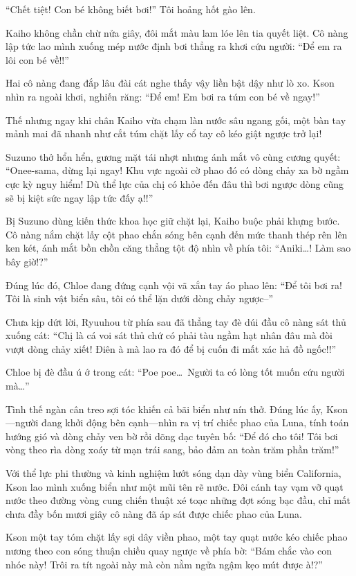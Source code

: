\documentclass[../main.tex]{subfiles}
\begin{document}
``Chết tiệt! Con bé không biết bơi!'' Tôi hoảng hốt gào lên.

Kaiho không chần chừ nửa giây, đôi mắt màu lam lóe lên tia quyết liệt. Cô nàng lập tức lao mình xuống mép nước định bơi thẳng ra khơi cứu người: ``Để em ra lôi con bé về!!''

Hai cô nàng đang đắp lâu đài cát nghe thấy vậy liền bật dậy như lò xo. Kson nhìn ra ngoài khơi, nghiến răng: ``Để em! Em bơi ra túm con bé về ngay!''

Thế nhưng ngay khi chân Kaiho vừa chạm làn nước sâu ngang gối, một bàn tay mảnh mai đã nhanh như cắt túm chặt lấy cổ tay cô kéo giật ngược trở lại!

Suzuno thở hổn hển, gương mặt tái nhợt nhưng ánh mắt vô cùng cương quyết: ``Onee-sama, dừng lại ngay! Khu vực ngoài cờ phao đó có dòng chảy xa bờ ngầm cực kỳ nguy hiểm! Dù thể lực của chị có khỏe đến đâu thì bơi ngược dòng cũng sẽ bị kiệt sức ngay lập tức đấy ạ!!''

Bị Suzuno dùng kiến thức khoa học giữ chặt lại, Kaiho buộc phải khựng bước. Cô nàng nắm chặt lấy cột phao chắn sóng bên cạnh đến mức thanh thép rên lên ken két, ánh mắt bồn chồn căng thẳng tột độ nhìn về phía tôi: ``Aniki\dots! Làm sao bây giờ!?''

Đúng lúc đó, Chloe đang đứng cạnh vội vã xắn tay áo phao lên: ``Để tôi bơi ra! Tôi là sinh vật biển sâu, tôi có thể lặn dưới dòng chảy ngược--''

Chưa kịp dứt lời, Ryuuhou từ phía sau đã thẳng tay đè dúi đầu cô nàng sát thủ xuống cát: ``Chị là cá voi sát thủ chứ có phải tàu ngầm hạt nhân đâu mà đòi vượt dòng chảy xiết! Điên à mà lao ra đó để bị cuốn đi mất xác hả đồ ngốc!!''

Chloe bị đè đầu ú ớ trong cát: ``Poe poe\dots\ Người ta có lòng tốt muốn cứu người mà\dots''

Tình thế ngàn cân treo sợi tóc khiến cả bãi biển như nín thở. Đúng lúc ấy, Kson—người đang khởi động bên cạnh—nhìn ra vị trí chiếc phao của Luna, tính toán hướng gió và dòng chảy ven bờ rồi dõng dạc tuyên bố: ``Để đó cho tôi! Tôi bơi vòng theo rìa dòng xoáy từ mạn trái sang, bảo đảm an toàn trăm phần trăm!''

Với thể lực phi thường và kinh nghiệm lướt sóng dạn dày vùng biển California, Kson lao mình xuống biển như một mũi tên rẽ nước. Đôi cánh tay vạm vỡ quạt nước theo đường vòng cung chiến thuật xé toạc những đợt sóng bạc đầu, chỉ mất chưa đầy bốn mươi giây cô nàng đã áp sát được chiếc phao của Luna.

Kson một tay tóm chặt lấy sợi dây viền phao, một tay quạt nước kéo chiếc phao nương theo con sóng thuận chiều quay ngược về phía bờ: ``Bám chắc vào con nhóc này! Trôi ra tít ngoài này mà còn nằm ngửa ngậm kẹo mút được à!?''
\end{document}
